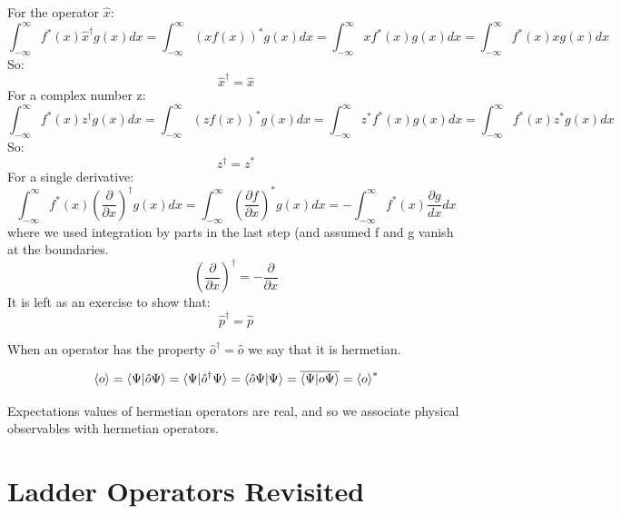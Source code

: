 \documentclass[12pt]{book}
\begin{document}
For the operator $\hat{x}$:
\begin{equation*}
\int_{-\infty}^{\infty} f^*(x)\hat{x}^\dagger g(x) dx = 
\int_{-\infty}^{\infty} \left(x f(x)\right)^* g(x) dx = 
\int_{-\infty}^{\infty} x f^*(x) g(x) dx = 
\int_{-\infty}^{\infty} f^*(x) x g(x) dx 
\end{equation*}
So:
\begin{equation}
\hat{x}^\dagger = \hat{x}
\end{equation}
For a complex number z:
\begin{equation*}
\int_{-\infty}^{\infty} f^*(x)z^\dagger g(x) dx = 
\int_{-\infty}^{\infty} \left(z f(x)\right)^* g(x) dx = 
\int_{-\infty}^{\infty} z^* f^*(x) g(x) dx = 
\int_{-\infty}^{\infty} f^*(x) z^* g(x) dx 
\end{equation*}
So:
\begin{equation}
z^\dagger = z^*
\end{equation}
For a single derivative:
\begin{equation*}
\int_{-\infty}^{\infty} f^*(x) \left( \frac{\partial}{\partial x} \right)^\dagger g(x) dx = 
\int_{-\infty}^{\infty} \left(\frac{\partial f}{\partial x}\right)^* g(x) dx = 
-\int_{-\infty}^{\infty} f^*(x) \frac{\partial g}{dx} dx  
\end{equation*}
where we used integration by parts in the last step (and assumed f and g vanish at the boundaries.
\begin{equation}
\left( \frac{\partial}{\partial x} \right)^{\dagger} = -\frac{\partial}{\partial x}
\end{equation}
It is left as an exercise to show that:
\begin{equation}
\hat{p}^\dagger = \hat{p}
\end{equation}

When an operator has the property $\hat{o}^\dagger = \hat{o}$ we say that it is hermetian.  

\begin{equation}
\braket{o} = \braket{\Psi|\hat{o}\Psi} = \braket{\Psi|\hat{o}^\dagger \Psi}
= \braket{\hat{o} \Psi| \Psi} = \overline{\braket{\Psi| o \Psi}} = \braket{o}^*
\end{equation}

Expectations values of hermetian operators are real, and so we associate physical observables with hermetian operators. 

\section{Ladder Operators Revisited}
\end{document}
